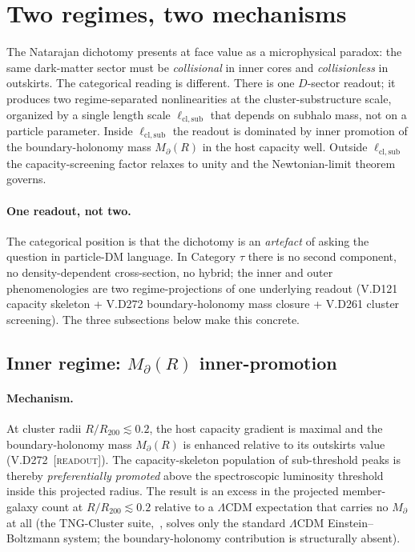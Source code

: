 \documentclass{pantarhei-researchnote}
\newcommand{\ellsub}{\ell_{\mathrm{cl},\mathrm{sub}}}  %
\newcommand{\Mpa}{M_{\partial}}                 %
\newcommand{\Rtwohun}{R_{200}}
\newcommand{\readout}{\textsc{[readout]}}
\begin{document}
\section{Two regimes, two mechanisms}\label{sec:two-regimes}

The Natarajan dichotomy presents at face value as a microphysical paradox:
the same dark-matter sector must be \emph{collisional} in inner cores and
\emph{collisionless} in outskirts. The categorical reading is different.
There is one $D$-sector readout; it produces two regime-separated
nonlinearities at the cluster-substructure scale, organized by a single
length scale $\ellsub$ that depends on subhalo mass, not on a particle
parameter. Inside $\ellsub$ the readout is dominated by inner promotion of
the boundary-holonomy mass $\Mpa(R)$ in the host capacity well. Outside
$\ellsub$ the capacity-screening factor relaxes to unity and the
Newtonian-limit theorem governs.

\paragraph{One readout, not two.}
The categorical position is that the dichotomy is an \emph{artefact} of
asking the question in particle-DM language. In Category $\tau$ there is
no second component, no density-dependent cross-section, no hybrid; the
inner and outer phenomenologies are two regime-projections of one
underlying readout (V.D121 capacity skeleton + V.D272 boundary-holonomy
mass closure + V.D261 cluster screening). The three subsections below
make this concrete.

\subsection{Inner regime: \texorpdfstring{$\Mpa(R)$}{M\_partial(R)} inner-promotion}\label{subsec:inner}

\paragraph{Mechanism.}
At cluster radii $R/\Rtwohun \lesssim 0.2$, the host capacity gradient is
maximal and the boundary-holonomy mass $\Mpa(R)$ is enhanced relative to
its outskirts value (V.D272~\readout). The capacity-skeleton population of
sub-threshold peaks is thereby \emph{preferentially promoted} above the
spectroscopic luminosity threshold inside this projected radius. The
result is an excess in the projected member-galaxy count at
$R/\Rtwohun \lesssim 0.2$ relative to a $\Lambda$CDM expectation that
carries no $\Mpa$ at all (the TNG-Cluster suite,~\cite{NelsonTNGC2024},
solves only the standard $\Lambda$CDM Einstein--Boltzmann system; the
boundary-holonomy contribution is structurally absent).
\end{document}
